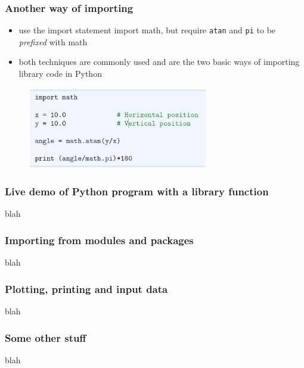 \documentclass[14pt]{beamer}
\newcommand\red[1]{{\color{red} #1}}
\begin{document}

\begin{frame}[fragile]
\frametitle{Another way of importing}
\begin{itemize}
\item use the import statement import math, but require \texttt{atan} and \texttt{pi} to be \red{\emph{prefixed}} with math
\item both techniques are commonly used and are the two basic ways of importing library code in Python
\end{itemize}
\begin{figure}[ht]
	\centering
	\includegraphics[width=0.7\textwidth]{figures/LLp14}
\end{figure}

\end{frame}



\begin{frame}[fragile]
\frametitle{Live demo of Python program with a library function}
blah
\end{frame}


\begin{frame}[fragile]
\frametitle{Importing from modules and packages}
blah
\end{frame}


\begin{frame}[fragile]
\frametitle{Plotting, printing and input data}
blah
\end{frame}


\begin{frame}[fragile]
\frametitle{Some other stuff}
blah
\end{frame}
\end{document}
